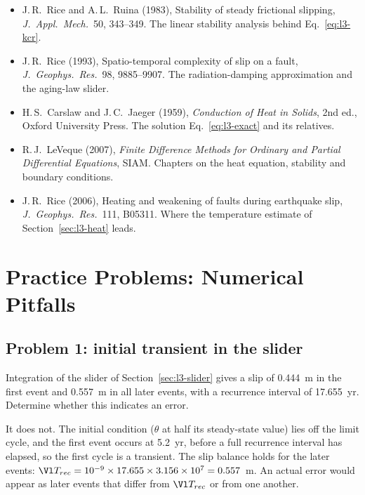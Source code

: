 \begin{itemize}[itemsep=2pt,topsep=2pt]
\item J.\,R.\ Rice and A.\,L.\ Ruina (1983), Stability of steady frictional slipping, \emph{J.\ Appl.\ Mech.}\ 50, 343--349. The linear stability analysis behind Eq.~\eqref{eq:l3-kcr}.
\item J.\,R.\ Rice (1993), Spatio-temporal complexity of slip on a fault, \emph{J.\ Geophys.\ Res.}\ 98, 9885--9907. The radiation-damping approximation and the aging-law slider.
\item H.\,S.\ Carslaw and J.\,C.\ Jaeger (1959), \emph{Conduction of Heat in Solids}, 2nd ed., Oxford University Press. The solution Eq.~\eqref{eq:l3-exact} and its relatives.
\item R.\,J.\ LeVeque (2007), \emph{Finite Difference Methods for Ordinary and Partial Differential Equations}, SIAM. Chapters on the heat equation, stability and boundary conditions.
\item J.\,R.\ Rice (2006), Heating and weakening of faults during earthquake slip, \emph{J.\ Geophys.\ Res.}\ 111, B05311. Where the temperature estimate of Section~\ref{sec:l3-heat} leads.
\end{itemize}

\section{Practice Problems: Numerical Pitfalls}
\label{sec:l3-problems}

\subsection*{Problem 1: initial transient in the slider}

Integration of the slider of Section~\ref{sec:l3-slider} gives a slip of 0.444~m in the first event and 0.557~m in all later events, with a recurrence interval of 17.655~yr. Determine whether this indicates an error.

\solution It does not. The initial condition ($\theta$ at half its steady-state value) lies off the limit cycle, and the first event occurs at 5.2~yr, before a full recurrence interval has elapsed, so the first cycle is a transient. The slip balance holds for the later events: $\Vl T_{rec}=10^{-9}\times17.655\times3.156\times10^7=0.557$~m. An actual error would appear as later events that differ from $\Vl T_{rec}$ or from one another.

